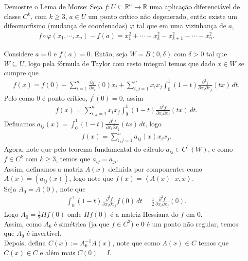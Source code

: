 \begin{homeworkProblem}[Seção 3-9]
  Demostre o Lema de Morse: Seja $f:U\subseteq\mathbb{R}^{n}\to\mathbb{R}$ uma aplicação diferenciável de classe $C^{k}$, com $k\geq 3$, $a\in U$ um ponto crítico não degenerado, então existe um difeomorfismo (mudança de coordenadas) $\varphi$ tal que em uma vizinhança de $a$,
  \begin{align*}
    f\circ\varphi(x_1,\cdots,x_n)-f(a)=x_1^{2}+\cdots+x_{k}^{2}-x_{k+1}^{2}-\cdots-x_{n}^{2}.
  \end{align*}
  \begin{solution}
    Considere $a=0$ e $f(a)=0$. Então, seja $W=B(0,\delta)$ com $\delta>0$ tal que $W\subseteq U$, logo pela fórmula de Taylor com resto integral temos que dado $x\in W$ se cumpre que 
    \begin{align*}
      f(x)=f(0)+\sum_{i=1}^{n}\frac{\partial f}{\partial x_{i}}(0)x_i+\sum_{i,j=1}^{n}x_ix_j \int_{0}^{1}(1-t)\frac{\partial^{2}f }{\partial x_i\partial x_j}(tx)\,dt.
    \end{align*}
    Pelo como $0$ é ponto crítico, $f^{\prime}(0)=0$, assim
    \begin{align*}
      f(x)=\sum_{i,j=1}^{n}x_ix_j \int_{0}^{1}(1-t)\frac{\partial^{2}f }{\partial x_i\partial x_j}(tx)\,dt.
    \end{align*}
    Definamos $a_{ij}(x)=\int_{0}^{1}(1-t)\frac{\partial^{2}f }{\partial x_i\partial x_j}(tx)\,dt$, logo
    \begin{align*}
      f(x)=\sum_{i,j=1}^{n}a_{ij}(x)x_ix_j.
    \end{align*}
    Agora, note que pelo teorema fundamental do cálculo $a_{ij}\in C^{1}(W)$, e como $f\in C^{k}$ com $k\geq 3$, temos que $a_{ij}=a_{ji}$.\\
    Assim, definamos a matriz $A(x)$ definida por componentes como $A(x)=(a_{ij}(x))$, logo note que $f(x)=\left\langle A(x)\cdot x,x \right\rangle$.\\
    Seja $A_0=A(0)$, note que
    \begin{align*}
      \int_{0}^{1}(1-t)\frac{\partial^{2} f}{\partial x_i\partial x_j}f(0)\,dt=\frac{1}{2}\frac{\partial^{2}f }{\partial x_i\partial x_j}(0).
    \end{align*}
    Logo $A_0=\frac{1}{2}Hf(0)$ onde $Hf(0)$ é a matriz Hessiana do $f$ em $0$.\\
    Assim, como $A_0$ é simétrica (ja que $f\in C^{3}$) e $0$ é um ponto não regular, temos que $A_0$ é invertível.\\
    Depois, defina $C(x):=A_{0}^{-1}A(x)$, note que como $A(x)\in C$ temos que $C(x)\in C$ e além mais $C(0)=I$.\\

\end{solution}
\end{homeworkProblem}
